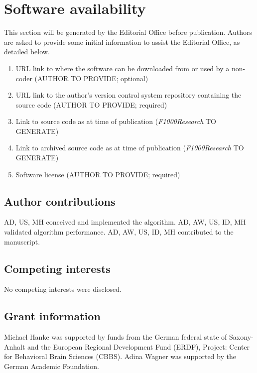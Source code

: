 \section*{Software availability}
This section will be generated by the Editorial Office before publication. Authors are asked to provide some initial information to assist the Editorial Office, as detailed below.
\begin{enumerate}
\item URL link to where the software can be downloaded from or used by a non-coder (AUTHOR TO PROVIDE; optional)
\item URL link to the author's version control system repository containing the source code (AUTHOR TO PROVIDE; required)
\item Link to source code as at time of publication ({\textit{F1000Research}} TO GENERATE)
\item Link to archived source code as at time of publication ({\textit{F1000Research}} TO GENERATE)
\item Software license (AUTHOR TO PROVIDE; required)
\end{enumerate}


\subsection*{Author contributions}
AD, US, MH conceived and implemented the algorithm.
AD, AW, US, ID, MH validated algorithm performance.
AD, AW, US, ID, MH contributed to the manuscript.

\subsection*{Competing interests}
No competing interests were disclosed.

\subsection*{Grant information}
Michael Hanke was supported by funds from the German federal state of
Saxony-Anhalt and the European Regional Development Fund (ERDF), 
Project: Center for Behavioral Brain Sciences (CBBS).
Adina Wagner was supported by the German Academic Foundation.

